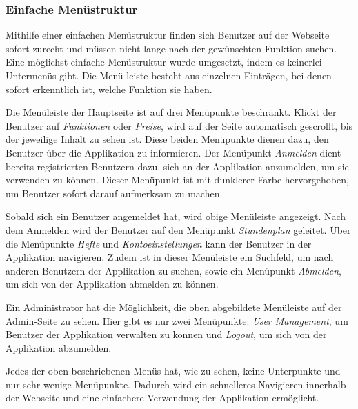 \subsubsection{Einfache Menüstruktur}
Mithilfe einer einfachen Menüstruktur finden sich Benutzer auf der Webseite sofort zurecht und müssen nicht lange nach der gewünschten Funktion suchen. Eine möglichst einfache Menüstruktur wurde umgesetzt, indem es keinerlei Untermenüs gibt. Die Menü-leiste besteht aus einzelnen Einträgen, bei denen sofort erkenntlich ist, welche Funktion sie haben.\\


Die Menüleiste der Hauptseite ist auf drei Menüpunkte beschränkt. Klickt der Benutzer auf \textit{Funktionen} oder \textit{Preise}, wird auf der Seite automatisch gescrollt, bis der jeweilige Inhalt zu sehen ist. Diese beiden Menüpunkte dienen dazu, den Benutzer über die Applikation zu informieren. Der Menüpunkt \textit{Anmelden} dient bereits registrierten Benutzern dazu, sich an der Applikation anzumelden, um sie verwenden zu können. Dieser Menüpunkt ist mit dunklerer Farbe hervorgehoben, um Benutzer sofort darauf aufmerksam zu machen.

\newpage


Sobald sich ein Benutzer angemeldet hat, wird obige Menüleiste angezeigt. Nach dem Anmelden wird der Benutzer auf den Menüpunkt \textit{Stundenplan} geleitet. Über die Menüpunkte \textit{Hefte} und \textit{Kontoeinstellungen} kann der Benutzer in der Applikation navigieren. Zudem ist in dieser Menüleiste ein Suchfeld, um nach anderen Benutzern der Applikation zu suchen, sowie ein Menüpunkt \textit{Abmelden}, um sich von der Applikation abmelden zu können.


Ein Administrator hat die Möglichkeit, die oben abgebildete Menüleiste auf der Admin-Seite zu sehen. Hier gibt es nur zwei Menüpunkte: \textit{User Management}, um Benutzer der Applikation verwalten zu können und \textit{Logout}, um sich von der Applikation abzumelden.

Jedes der oben beschriebenen Menüs hat, wie zu sehen, keine Unterpunkte und nur sehr wenige Menüpunkte. Dadurch wird ein schnelleres Navigieren innerhalb der Webseite und eine einfachere Verwendung der Applikation ermöglicht.

